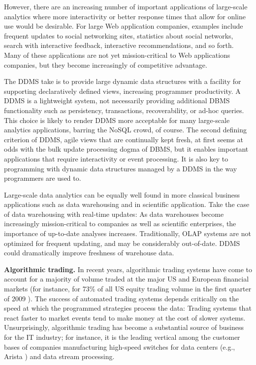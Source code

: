 However, there are an increasing number of important applications of large-scale analytics where more interactivity or better response times that allow for online use would be desirable. For large Web application companies, examples include frequent updates to social networking sites, statistics about social networks, search with interactive feedback, interactive recommendations, and so forth.
Many of these applications are not yet mission-critical to Web applications companies, but they become increasingly of competitive advantage.

The DDMS take is to provide large dynamic data structures with a facility for supporting declaratively defined views, increasing programmer productivity. A DDMS is a lightweight system, not necessarily providing additional DBMS functionality such as persistency, transactions, recoverability, or ad-hoc queries. This choice is likely to render DDMS more acceptable for many large-scale analytics applications, barring the NoSQL crowd, of course. The second defining criterion of DDMS, agile views that are continually kept fresh, at first seems at odds with the bulk update processing dogma of DBMS, but it enables important applications that require interactivity or event processing. It is also key to programming with dynamic data structures managed by a DDMS in the way programmers are used to.

Large-scale data analytics can be equally well found in more classical business applications such as data warehousing and in scientific application. Take the case of data warehousing with real-time updates:
As data warehouses become increasingly mission-critical to companies as well as scientific enterprises, the importance of up-to-date analyses increases. Traditionally, OLAP systems are not optimized for frequent updating, and may be considerably out-of-date. DDMS could dramatically improve freshness of warehouse data.

\medskip

{\bf Algorithmic trading.}\/
In recent years, algorithmic trading systems have come to account for a majority of volume traded at the major US and European financial markets (for instance, for 73\% of all US equity trading volume in the first quarter of 2009 \cite{Iati2009}). The success of automated trading systems depends critically on the speed at which the programmed strategies process the data: Trading systems that react faster to market events tend to make money at the cost of slower systems.
Unsurprisingly, algorithmic trading has become a substantial source of business for the IT industry; for instance, it is the leading vertical among the customer bases of companies manufacturing high-speed switches for data centers
(e.g., Arista \cite{Becht2010}) and data stream processing.

